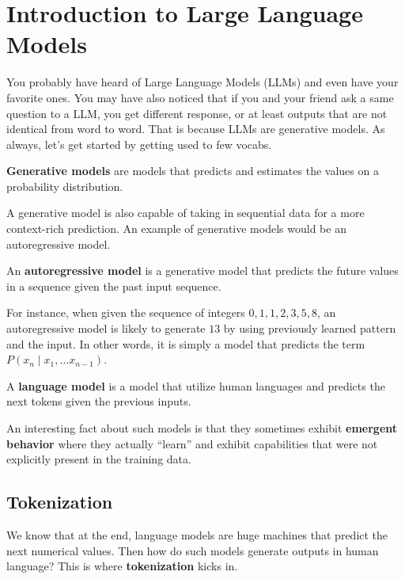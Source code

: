\documentclass[../../main.tex]{subfiles}
\begin{document}
\section{Introduction to Large Language Models}

You probably have heard of Large Language Models (LLMs)
and even have your favorite ones. You may have also noticed
that if you and your friend ask a same question to a LLM,
you get different response, or at least outputs that are
not identical from word to word. That is because LLMs
are generative models. As always, let's get started by
getting used to few vocabs.

\begin{definition}{}{}
\textbf{Generative models} are models that predicts and
estimates the values on a probability distribution.
\end{definition}

A generative model is also capable of taking in sequential
data for a more context-rich prediction. An example of
generative models would be an autoregressive model.

\begin{definition}{}{}
An \textbf{autoregressive model} is a generative model
that predicts the future values in a sequence given the
past input sequence.
\end{definition}

For instance, when given the sequence of integers
$0, 1, 1, 2, 3, 5, 8$, an autoregressive model is likely
to generate $13$ by using previously learned pattern and
the input. In other words, it is simply a model that
predicts the term $P(x_n \mid x_1, \ldots x_{n-1})$.

\begin{definition}{}{}
A \textbf{language model} is a model that utilize human
languages and predicts the next tokens given the previous
inputs.
\end{definition}

An interesting fact about such models is that they sometimes
exhibit \textbf{emergent behavior} where they actually
``learn'' and exhibit capabilities that were not explicitly
present in the training data.

\subsection{Tokenization}

We know that at the end, language models are huge machines
that predict the next numerical values. Then how do such
models generate outputs in human language? This is where
\textbf{tokenization} kicks in.
\end{document}
